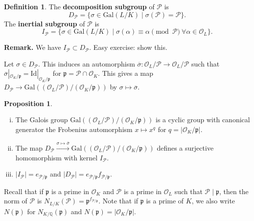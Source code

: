 \documentclass{article}
\theoremstyle{definition}
\newtheorem{prop}[theorem]{Proposition}
\newtheorem{defn}[theorem]{Definition}
\begin{document}
\begin{defn}
    The \textbf{decomposition subgroup} of $\mathcal{P}$ is $$D_{\mathcal{P}} = \{\sigma \in \text{Gal}(L/K) \mid \sigma(\mathcal{P})=\mathcal{P}\}.$$
    The \textbf{inertial subgroup} of $\mathcal{P}$ is \[
    I_{\mathcal{P}} = \{\sigma \in \text{Gal}(L/K) \mid \sigma(\alpha) \equiv \alpha \pmod{\mathcal{P}} ~\forall \alpha \in \mathcal{O}_L\}.
    \]
\end{defn}
\textbf{Remark.} We have $I_{\mathcal{P}} \subset D_{\mathcal{P}}$. Easy exercise: show this.
\vspace{1mm}
 
Let $\sigma \in D_\mathcal{P}$. This induces an automorphism $\overline{\sigma} : \mathcal{O}_L/\mathcal{P} \to \mathcal{O}_L/\mathcal{P}$ such that $\overline{\sigma}|_{\mathcal{O}_K/\mathfrak{p}} = \text{Id}|_{\mathcal{O}_K/\mathfrak{p}}$ for $\mathfrak{p} = \mathcal{P} \cap \mathcal{O}_K$. This gives a map $D_{\mathcal{P}} \to \text{Gal}((\mathcal{O}_L/\mathcal{P})/ (\mathcal{O}_K/\mathfrak{p}))$ by $\sigma \mapsto \overline{\sigma}$.

\begin{prop}\label{prop0.1}
    \begin{enumerate}[(i)]
        \item The Galois group $\text{Gal}((\mathcal{O}_L/\mathcal{P})/ (\mathcal{O}_K/\mathfrak{p}))$ is a cyclic group with canonical generator the Frobenius automorphism $x \mapsto x^q$ for $q = |\mathcal{O}_K/\mathfrak{p}|$.
        \item The map $D_{\mathcal{P}} \stackrel{\sigma \mapsto \overline{\sigma}}{\to} \text{Gal}((\mathcal{O}_L/\mathcal{P})/ (\mathcal{O}_K/\mathfrak{p}))$ defines a surjective homomorphism with kernel $I_{\mathcal{P}}$.
        \item $|I_{\mathcal{P}}| = e_{\mathcal{P}/\mathfrak{p}}$ and $|D_{\mathcal{P}}| = e_{\mathcal{P}/\mathfrak{p}}f_{\mathcal{P}/\mathfrak{p}}$.
    \end{enumerate}
\end{prop}
Recall that if $\mathfrak{p}$ is a prime in $\mathcal{O}_K$ and $\mathcal{P}$ is a prime in $\mathcal{O}_L$ such that $\mathcal{P} \mid  \mathfrak{p}$, then the norm of $\mathcal{P}$ is $N_{L/K}(\mathcal{P}) = \mathfrak{p}^{f_{\mathcal{P}/\mathfrak{p}}}$. Note that if $\mathfrak{p}$ is a prime of $K$, we also write $N(\mathfrak{p})$ for $N_{K/\mathbb{Q}}(\mathfrak{p})$ and $N(\mathfrak{p}) = |\mathcal{O}_K/\mathfrak{p}|$.
\end{document}
